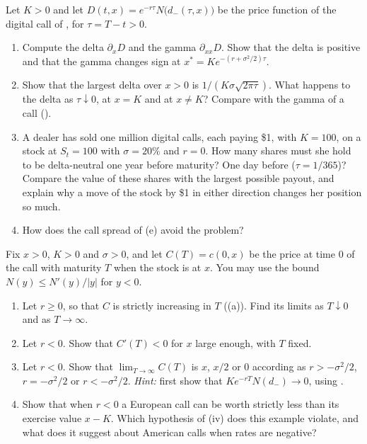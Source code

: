 \begin{exercise}\label{ex:bs-digital-greeks}
\medium Let $K>0$ and let $D(t,x)=e^{-r\tau}N\big(d_-(\tau,x)\big)$ be the price function of
the digital call of , for $\tau=T-t>0$.
\begin{enumerate}[label=(\alph*)]
  \item Compute the delta $\partial_xD$ and the gamma $\partial_{xx}D$. Show that the delta
    is positive and that the gamma changes sign at $x^*=Ke^{-(r+\sigma^2/2)\tau}$.
  \item Show that the largest delta over $x>0$ is $1/(K\sigma\sqrt{2\pi\tau})$. What happens
    to the delta as $\tau\downarrow0$, at $x=K$ and at $x\ne K$? Compare with the gamma of a
    call ().
  \item A dealer has sold one million digital calls, each paying \$1, with $K=100$, on a
    stock at $S_t=100$ with $\sigma=20\%$ and $r=0$. How many shares must she hold to be
    delta-neutral one year before maturity? One day before ($\tau=1/365$)? Compare the
    value of these shares with the largest possible payout, and explain why a move of the
    stock by \$1 in either direction changes her position so much.
  \item How does the call spread of (e) avoid the problem?
\end{enumerate}
\end{exercise}

\begin{exercise}\label{ex:bs-maturity}
\medium Fix $x>0$, $K>0$ and $\sigma>0$, and let $C(T)=c(0,x)$ be the price at time $0$ of the
call with maturity $T$ when the stock is at $x$. You may use the bound
$N(y)\le N'(y)/|y|$ for $y<0$.
\begin{enumerate}[label=(\alph*)]
  \item Let $r\ge0$, so that $C$ is strictly increasing in $T$
    ((a)). Find its limits as $T\downarrow0$ and as $T\to\infty$.
  \item Let $r<0$. Show that $C'(T)<0$ for $x$ large enough, with $T$ fixed.
  \item Let $r<0$. Show that $\lim_{T\to\infty}C(T)$ is $x$, $x/2$ or $0$ according as
    $r>-\sigma^2/2$, $r=-\sigma^2/2$ or $r<-\sigma^2/2$. \emph{Hint:} first show that
    $Ke^{-rT}N(d_-)\to0$, using .
  \item Show that when $r<0$ a European call can be worth strictly less than its exercise
    value $x-K$. Which hypothesis of (iv) does this example
    violate, and what does it suggest about American calls when rates are negative?
\end{enumerate}
\end{exercise}

